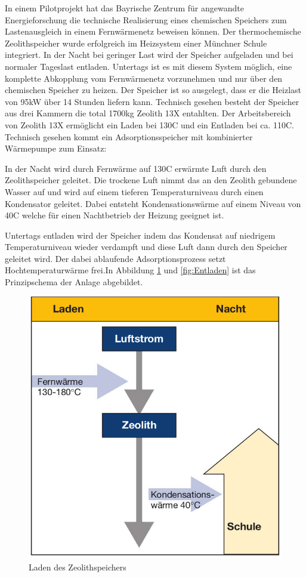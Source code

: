 \documentclass[11pt,a4paper]{scrartcl}
\begin{document}
In einem Pilotprojekt hat das Bayrische Zentrum für angewandte Energieforschung
die technische Realisierung eines chemischen Speichers zum Lastenausgleich in
einem Fernwärmenetz beweisen können. Der thermochemische Zeolithspeicher wurde
erfolgreich im Heizsystem einer Münchner Schule integriert. In der Nacht bei
geringer Last wird der Speicher aufgeladen und bei normaler Tageslast entladen.
Untertags ist es mit diesem System möglich, eine komplette Abkopplung vom
Fernwärmenetz vorzunehmen und nur über den chemischen Speicher zu heizen. Der
Speicher ist so ausgelegt, dass er die Heizlast von 95kW über 14 Stunden liefern
kann. Technisch gesehen besteht der Speicher aus drei Kammern die total 1700kg
Zeolith 13X entahlten. Der Arbeitsbereich von Zeolith 13X ermöglicht ein Laden
bei 130\textdegree C und ein Entladen bei ca. 110\textdegree C. Technisch
gesehen kommt ein Adsorptionsspeicher mit kombinierter Wärmepumpe zum Einsatz:

In der Nacht wird durch Fernwärme auf 130\textdegree C erwärmte Luft durch den
Zeolithspeicher geleitet. Die trockene Luft nimmt das an den Zeolith gebundene
Wasser auf und wird auf einem tieferen Temperaturniveau durch einen Kondensator
geleitet. Dabei entsteht Kondensationswärme auf einem Niveau von 40\textdegree C
welche für einen Nachtbetrieb der Heizung geeignet ist. 

Untertags entladen wird der Speicher indem das Kondensat auf niedrigem
Temperaturniveau wieder verdampft und diese Luft dann durch den Speicher
geleitet wird. Der dabei ablaufende Adsorptionsprozess setzt Hochtemperaturwärme
frei.In Abbildung \ref{fig:Laden} und \ref{fig:Entladen} ist das Prinzipschema
der Anlage abgebildet.

\begin{figure}[h!]
\begin{center}
\includegraphics[scale=1]{images/Laden.jpg}
\caption{Laden des Zeolithspeichers \cite{BINE2}}
\label{fig:Laden}
\end{center}
\end{figure}
\end{document}

